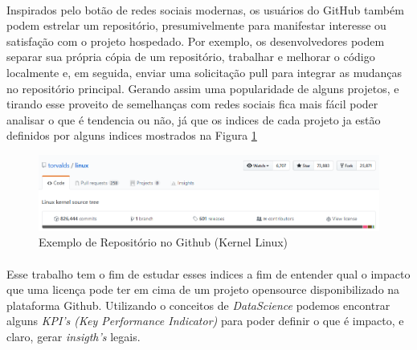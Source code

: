 \paragraph{}
Inspirados pelo botão de redes sociais modernas, os usuários do GitHub também podem estrelar um repositório, presumivelmente para manifestar interesse ou satisfação com o projeto hospedado\cite{gousios2014exploratory, gousios2015work}. Por exemplo, os desenvolvedores podem separar sua própria cópia de um repositório, trabalhar e melhorar o código localmente e, em seguida, enviar uma solicitação pull para integrar as mudanças no repositório principal\cite{borges2016understanding}. Gerando assim uma popularidade de alguns projetos, e tirando esse proveito de semelhanças com redes sociais fica mais fácil poder analisar o que é tendencia ou não, já que os indices de cada projeto ja estão definidos por alguns indices mostrados na Figura \ref{fig:github-linux}
\begin{figure}[]
    \centering
    \includegraphics[width=\linewidth]{assets/images/github-linux.PNG}
    \caption{Exemplo de Repositório no Github (Kernel Linux)}
    \label{fig:github-linux}
\end{figure}

\paragraph{}
Esse trabalho tem o fim de estudar esses indices a fim de entender qual o impacto que uma licença pode ter em cima de um projeto opensource disponibilizado na plataforma Github. Utilizando o conceitos de \textit{DataScience} podemos encontrar alguns \textit{KPI's (Key Performance Indicator)} para poder definir o que é impacto, e claro, gerar \textit{insigth's} legais.

